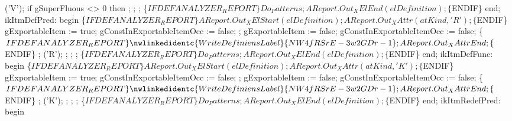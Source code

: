            ('V');
            if gSuperFluous <> 0 then
               ;
            ;
            ;
            \{$IFDEF ANALYZER_REPORT\}
            Do_Patterns;
            AReport.Out_XElEnd(elDefinition);
            \{$ENDIF\}
         end;
      ikItmDefPred:
         begin
            \{$IFDEF ANALYZER_REPORT\}
            AReport.Out_XElStart(elDefinition);
            AReport.Out_XAttr(atKind, 'R');
            \{$ENDIF\}
            gExportableItem := true;
            gConstInExportableItemOcc := false;
            ;
            gExportableItem := false;
            gConstInExportableItemOcc := false;
            \{$IFDEF ANALYZER_REPORT\}
            \nwlinkedidentc{WriteDefiniensLabel}{NW4fRSrE-3w2GDr-1};
            AReport.Out_XAttrEnd;
            \{$ENDIF\}
            ;
            ('R');
            ;
            ;
            ;
            \{$IFDEF ANALYZER_REPORT\}
            Do_Patterns;
            AReport.Out_XElEnd(elDefinition);
            \{$ENDIF\}
         end;
      ikItmDefFunc:
         begin
            \{$IFDEF ANALYZER_REPORT\}
            AReport.Out_XElStart(elDefinition);
            AReport.Out_XAttr(atKind, 'K');
            \{$ENDIF\}
            gExportableItem := true;
            gConstInExportableItemOcc := false;
            ;
            gExportableItem := false;
            gConstInExportableItemOcc := false;
            \{$IFDEF ANALYZER_REPORT\}
            \nwlinkedidentc{WriteDefiniensLabel}{NW4fRSrE-3w2GDr-1};
            AReport.Out_XAttrEnd;
            \{$ENDIF\}
            ;
            ('K');
            ;
            ;
            ;
            \{$IFDEF ANALYZER_REPORT\}
            Do_Patterns;
            AReport.Out_XElEnd(elDefinition);
            \{$ENDIF\}
         end;
      ikItmRedefPred:
         begin
